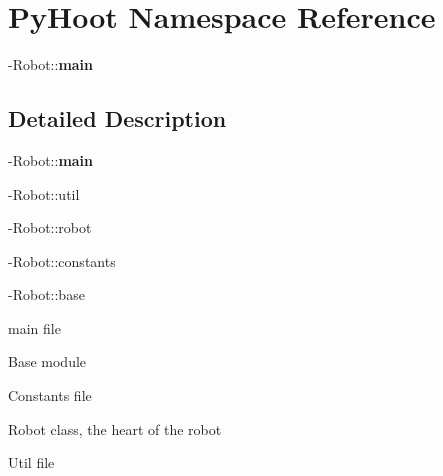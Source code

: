 \hypertarget{namespace_py_hoot}{}\section{Py\+Hoot Namespace Reference}
\label{namespace_py_hoot}


-\/\+Robot\+:\+:{\bfseries main}  




\subsection{Detailed Description}
-\/\+Robot\+:\+:{\bfseries main} 

-\/\+Robot\+::util

-\/\+Robot\+::robot

-\/\+Robot\+::constants

-\/\+Robot\+::base

\begin{DoxyVerb}main file\end{DoxyVerb}


\begin{DoxyVerb}Base module\end{DoxyVerb}


\begin{DoxyVerb}Constants file\end{DoxyVerb}


\begin{DoxyVerb}Robot class, the heart of the robot
\end{DoxyVerb}


\begin{DoxyVerb}Util file\end{DoxyVerb}
 